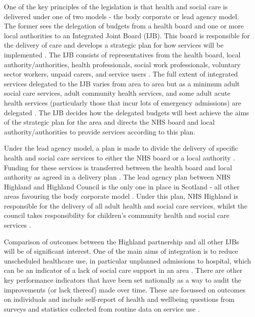 \documentclass[12pt,]{report}
\begin{document}
One of the key principles of the legislation is that health and social
care is delivered under one of two models - the body corporate or lead
agency model. The former sees the delegation of budgets from a health
board and one or more local authorities to an Integrated Joint Board
(IJB). This board is responsible for the delivery of care and develops a
strategic plan for how services will be implemented
\citep{RN455, RN232, RN366}. The IJB consists of representatives from
the health board, local authority/authorities, health professionals,
social work professionals, voluntary sector workers, unpaid carers, and
service users \citep{RN252, RN232}. The full extent of integrated
services delegated to the IJB varies from area to area but as a minimum
adult social care services, adult community health services, and some
adult acute health services (particularly those that incur lots of
emergency admissions) are delegated \citep{RN455, RN252, RN232, RN366}.
The IJB decides how the delegated budgets will best achieve the aims of
the strategic plan for the area and directs the NHS board and local
authority/authorities to provide services according to this
plan\citep{RN252, RN366}.

Under the lead agency model, a plan is made to divide the delivery of
specific health and social care services to either the NHS board or a
local authority \citep{RN455, RN252, RN232, RN366}. Funding for these
services is transferred between the health board and local authority as
agreed in a delivery plan \citep{RN252, RN366}. The lead agency plan
between NHS Highland and Highland Council is the only one in place in
Scotland - all other areas favouring the body corporate model
\citep{RN455, RN252, RN232, RN366}. Under this plan, NHS Highland is
responsible for the delivery of all adult health and social care
services, whilst the council takes responsibility for children's
community health and social care services \citep{RN232, RN366}.

Comparison of outcomes between the Highland partnership and all other
IJBs will be of significant interest. One of the main aims of
integration is to reduce unscheduled healthcare use, in particular
unplanned admissions to hospital, which can be an indicator of a lack of
social care support in an area \citep{RN455, RN252, RN251}. There are
other key performance indicators that have been set nationally as a way
to audit the improvements (or lack thereof) made over time. These are
focussed on outcomes on individuals and include self-report of health
and wellbeing questions from surveys and statistics collected from
routine data on service use \citep{RN465, RN464, RN366}.
\end{document}
